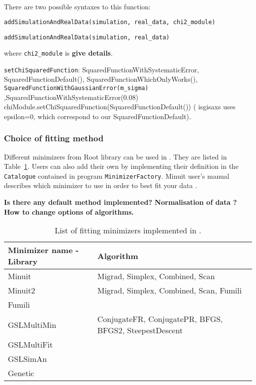 There are two possible syntaxes to this function: 
\begin{lstlisting}[language=python, style=eclipse,numbers=none]
addSimulationAndRealData(simulation, real_data, chi2_module)

addSimulationAndRealData(simulation, real_data)
\end{lstlisting}
where \texttt{chi2\_module} is \textbf{give details}.

\texttt{setChiSquaredFunction}: SquaredFunctionWithSystematicError, SquaredFunctionDefault(), SquaredFunctionWhichOnlyWorks(),
\texttt{SquaredFunctionWithGaussianError(m\_sigma)}
,SquaredFunctionWithSystematicError(0.08) 
chiModule.setChiSquaredFunction(SquaredFunctionDefault()) ( isgisaxs
uses epsilon=0, which correspond to our SquaredFunctionDefault). 


\subsubsection{Choice of fitting method}
Different minimizers from Root library can be used in \BornAgain. They are listed in
Table~\ref{table:fit_minimizers}. Users can also add their own by
implementing their definition in the \texttt{Catalogue} contained in
program \texttt{MinimizerFactory}.
Minuit user's manual describes which minimizer to use in order to best
fit your data \cite{MinuitRoot}.

\textbf{Is there any default method implemented?
Normalisation of data ?
How to change options of algorithms.}

\begin{table}[h]
\centering
\begin{tabular}{@{}ll@{}}
\hline
\hline
\textbf{Minimizer name - Library} & \textbf{Algorithm} \\
\hline
Minuit & Migrad, Simplex, Combined, Scan\\
Minuit2 & Migrad, Simplex, Combined, Scan, Fumili \\
Fumili & \\
GSLMultiMin & ConjugateFR, ConjugatePR, BFGS, BFGS2, SteepestDescent \\
GSLMultiFit & \\
GSLSimAn & \\ %
Genetic &  \\ %
\hline
\hline
\end{tabular}
\caption{List of fitting minimizers implemented in \BornAgain.}
\label{table:fit_minimizers}
\end{table}

